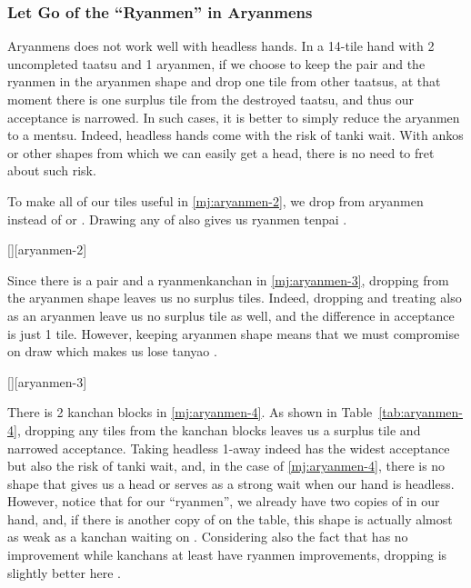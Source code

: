 \documentclass[12pt]{article}
\begin{document}
\subsubsection*{Let Go of the ``Ryanmen'' in Aryanmens}

Aryanmens does not work well with headless hands. In a 14-tile hand with 2 uncompleted taatsu and 1 aryanmen, if we choose to keep the pair and the ryanmen in the aryanmen shape and drop one tile from other taatsus, at that moment there is one surplus tile from the destroyed taatsu, and thus our acceptance is narrowed. In such cases, it is better to simply reduce the aryanmen to a mentsu. Indeed, headless hands come with the risk of tanki wait. With ankos or other shapes from which we can easily get a head, there is no need to fret about such risk.

To make all of our tiles useful in \ref{mj:aryanmen-2}, we drop  from aryanmen instead of  or . Drawing any of  also gives us ryanmen tenpai \citep[][p.~105]{uzaku-haikouritsu}.

[][aryanmen-2]

Since there is a  pair and a  ryanmenkanchan in \ref{mj:aryanmen-3}, dropping  from the aryanmen shape leaves us no surplus tiles. Indeed, dropping  and treating  also as an aryanmen leave us no surplus tile as well, and the difference in acceptance is just 1 tile. However, keeping  aryanmen shape means that we must compromise on  draw which makes us lose tanyao \citep[][p.~104]{uzaku-haikouritsu}.

[][aryanmen-3]

There is 2 kanchan blocks in \ref{mj:aryanmen-4}. As shown in Table~\ref{tab:aryanmen-4}, dropping any tiles from the kanchan blocks leaves us a surplus tile and narrowed acceptance. Taking headless 1-away indeed has the widest acceptance but also the risk of tanki wait, and, in the case of \ref{mj:aryanmen-4}, there is no shape that gives us a head or serves as a strong wait when our hand is headless. However, notice that for our  ``ryanmen'', we already have two copies of  in our hand, and, if there is another copy of  on the table, this  shape is actually almost as weak as a kanchan waiting on . Considering also the fact that  has no improvement while kanchans at least have ryanmen improvements, dropping  is slightly better here \citep{hirasawa-aryanmen}.
\end{document}
